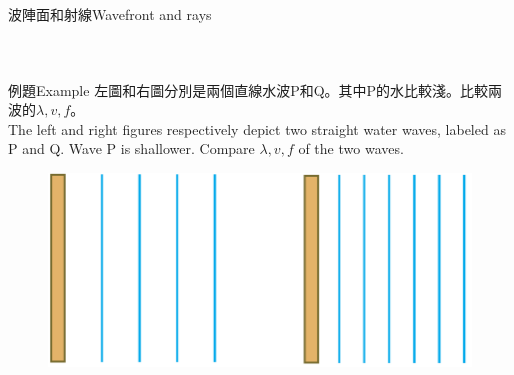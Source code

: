 \documentclass[beamer=true]{standalone}
\begin{document}
\begin{frame}{波陣面和射線Wavefront and rays}
\begin{columns}
\begin{figure}
        \end{figure}


    \end{columns}
\end{frame}

\begin{frame}[t]{例題Example}
    左圖和右圖分別是兩個直線水波P和Q。其中P的水比較淺。比較兩波的\(\lambda,v,f\)。\\The left and right figures respectively depict two straight water waves, labeled as P and Q. Wave P is shallower. Compare \(\lambda,v,f\) of the two waves.
    \begin{figure}
        \centering
        \includegraphics[width=0.65\linewidth]{images/Screenshot 2023-09-26 at 11.25.42 PM.png}


    \end{figure}
\end{frame}
\end{document}
